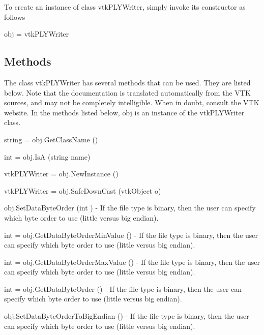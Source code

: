 To create an instance of class vtk\-P\-L\-Y\-Writer, simply invoke its constructor as follows \begin{DoxyVerb}  obj = vtkPLYWriter
\end{DoxyVerb}
 \hypertarget{vtkwidgets_vtkxyplotwidget_Methods}{}\subsection{Methods}\label{vtkwidgets_vtkxyplotwidget_Methods}
The class vtk\-P\-L\-Y\-Writer has several methods that can be used. They are listed below. Note that the documentation is translated automatically from the V\-T\-K sources, and may not be completely intelligible. When in doubt, consult the V\-T\-K website. In the methods listed below, {\ttfamily obj} is an instance of the vtk\-P\-L\-Y\-Writer class. 
\begin{DoxyItemize}
\item {\ttfamily string = obj.\-Get\-Class\-Name ()}  
\item {\ttfamily int = obj.\-Is\-A (string name)}  
\item {\ttfamily vtk\-P\-L\-Y\-Writer = obj.\-New\-Instance ()}  
\item {\ttfamily vtk\-P\-L\-Y\-Writer = obj.\-Safe\-Down\-Cast (vtk\-Object o)}  
\item {\ttfamily obj.\-Set\-Data\-Byte\-Order (int )} -\/ If the file type is binary, then the user can specify which byte order to use (little versus big endian).  
\item {\ttfamily int = obj.\-Get\-Data\-Byte\-Order\-Min\-Value ()} -\/ If the file type is binary, then the user can specify which byte order to use (little versus big endian).  
\item {\ttfamily int = obj.\-Get\-Data\-Byte\-Order\-Max\-Value ()} -\/ If the file type is binary, then the user can specify which byte order to use (little versus big endian).  
\item {\ttfamily int = obj.\-Get\-Data\-Byte\-Order ()} -\/ If the file type is binary, then the user can specify which byte order to use (little versus big endian).  
\item {\ttfamily obj.\-Set\-Data\-Byte\-Order\-To\-Big\-Endian ()} -\/ If the file type is binary, then the user can specify which byte order to use (little versus big endian).  

\end{DoxyItemize}
